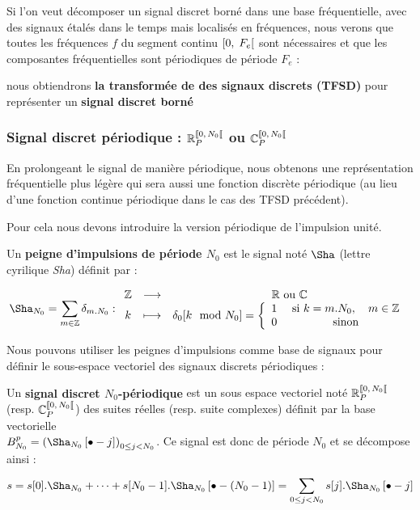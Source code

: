 \begin{remarque}
  Si l'on veut décomposer un signal discret borné dans une base fréquentielle, avec des signaux étalés dans le temps mais localisés en fréquences, nous verons que toutes les fréquences $f$ du segment continu $\left[0,\;F_e\right[$ sont nécessaires et que les composantes fréquentielles sont périodiques de période $F_e$ :

nous obtiendrons \textbf{la transformée de \Fourier{} des signaux discrets (TFSD)} pour représenter un \textbf{signal discret borné}
\end{remarque}


\subsubsection{Signal discret périodique : $\RNper$ ou $\CNper$}
En prolongeant le signal de manière périodique, nous obtenons une
représentation fréquentielle plus légère qui sera aussi une fonction
discrète périodique (au lieu d'une fonction continue périodique dans
le cas des TFSD précédent).

Pour cela nous devons introduire la version périodique de l'impulsion unité.

\begin{definition}
  Un \textbf{peigne d'impulsions de période $N_0$} est le signal noté
  $\Sha$ (lettre cyrilique \emph{Sha}) définit par :
  
  \begin{equation}
    \Sha_{N_0} = \sum\limits_{m\in\mathbb{Z}} \delta_{m.N_0}: \application{\Z}{\R \text{ ou } \C}{k}{\delta_0[k\mod{}N_0]=\pparMorceaux{1}{\text{ si } k = m.N_0,\quad m\in\Z}{0}{\text{ sinon}}}
\end{equation}

\end{definition}

Nous pouvons utiliser les peignes d'impulsions comme base de signaux pour définir le sous-espace vectoriel des signaux discrets périodiques :
\begin{definition}
  \label{def:signal_discret_periodique}
  Un \textbf{signal discret $N_0$-périodique}  est un sous espace vectoriel noté
  $\RNper$ (resp. $\CNper$) des suites réelles (resp. suite
  complexes) définit par la base vectorielle \\$B_{N_0}^p=\left(\Sha_{N_0}\b{\bullet-j}\right)_{0\leq j<N_0}$. Ce signal est donc de période $N_0$ et se décompose ainsi :
  \begin{equation}
  s = s[0].\Sha_{N_0} + \dots + s[N_0-1].\Sha_{N_0}\b{\bullet-(N_0-1)} = \somme{0\leq j< N_0}{}{s[j].\Sha_{N_0}\b{\bullet-j}}
  \end{equation}
\end{definition}

